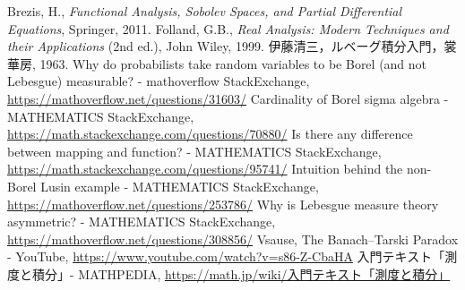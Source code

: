 \begin{thebibliography}{99}
	 Brezis, H., \textit{Functional Analysis, Sobolev Spaces, and Partial Differential Equations}, Springer, 2011.
	 Folland, G.B., \textit{Real Analysis: Modern Techniques and their Applications} (2nd ed.), John Wiley, 1999.
	 伊藤清三，ルベーグ積分入門，裳華房, 1963.
	 Why do probabilists take random variables to be Borel (and not Lebesgue) measurable? - mathoverflow StackExchange,
		\url{https://mathoverflow.net/questions/31603/}
	 Cardinality of Borel sigma algebra - MATHEMATICS StackExchange,\\
		\url{https://math.stackexchange.com/questions/70880/}
	 Is there any difference between mapping and function? - MATHEMATICS StackExchange,\\
		\url{https://math.stackexchange.com/questions/95741/}
	 Intuition behind the non-Borel Lusin example - MATHEMATICS StackExchange,\\
		\url{https://mathoverflow.net/questions/253786/}
	 Why is Lebesgue measure theory asymmetric? - MATHEMATICS StackExchange,\\
		\url{https://mathoverflow.net/questions/308856/}
	 Vsause, The Banach–Tarski Paradox - YouTube,
		\url{https://www.youtube.com/watch?v=s86-Z-CbaHA}
	 入門テキスト「測度と積分」- MATHPEDIA,
		\href{https://math.jp/wiki/%E5%85%A5%E9%96%80%E3%83%86%E3%82%AD%E3%82%B9%E3%83%88%E3%80%8C%E6%B8%AC%E5%BA%A6%E3%81%A8%E7%A9%8D%E5%88%86%E3%80%8D}{https://math.jp/wiki/入門テキスト「測度と積分」}
\end{thebibliography}
